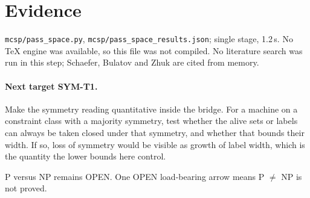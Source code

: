 \documentclass[11pt]{article}
\begin{document}
\section{Evidence}
\texttt{mcsp/pass\_space.py}, \texttt{mcsp/pass\_space\_results.json}; single stage, 1.2\,s. No TeX engine was available, so this file was not compiled. No literature search was run in this step; Schaefer, Bulatov and Zhuk are cited from memory.

\paragraph{Next target SYM-T1.} Make the symmetry reading quantitative inside the bridge. For a machine on a constraint class with a majority symmetry, test whether the alive sets or labels can always be taken closed under that symmetry, and whether that bounds their width. If so, loss of symmetry would be visible as growth of label width, which is the quantity the lower bounds here control.

\medskip\noindent P versus NP remains OPEN. One OPEN load-bearing arrow means P $\ne$ NP is not proved.
\end{document}
